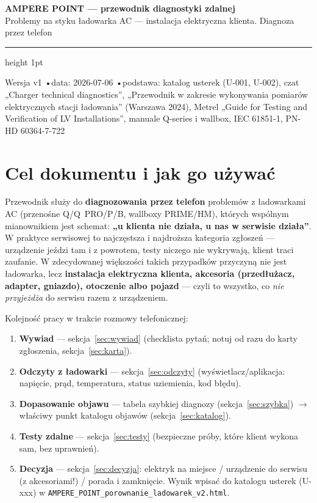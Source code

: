 \documentclass[11pt]{article}
\newcommand{\key}[1]{\textbf{\color{navy}#1}}
\begin{document}
{\sffamily\bfseries\color{navy}\LARGE AMPERE POINT — przewodnik diagnostyki zdalnej}\\[3pt]
{\sffamily\large\color{navy} Problemy na styku ładowarka AC — instalacja elektryczna klienta. Diagnoza przez telefon}\\[6pt]
{\color{rulegrey}\hrule height 1pt}\vspace{4pt}
{\footnotesize\sffamily Wersja v1 \quad•\quad data: 2026-07-06 \quad•\quad podstawa: katalog usterek (U-001, U-002), czat „Charger technical diagnostics'', „Przewodnik w zakresie wykonywania pomiarów elektrycznych stacji ładowania'' (Warszawa 2024), Metrel „Guide for Testing and Verification of LV Installations'', manuale Q-series i wallbox, IEC 61851-1, PN-HD 60364-7-722}\\[2pt]

{\small\setcounter{tocdepth}{1}\tableofcontents}
\clearpage

\section{Cel dokumentu i jak go używać}
Przewodnik służy do \key{diagnozowania przez telefon} problemów z ładowarkami AC (przenośne Q/Q~PRO/P/B, wallboxy PRIME/HM), których wspólnym mianownikiem jest schemat: \key{„u klienta nie działa, u nas w serwisie działa''}. W praktyce serwisowej to najczęstsza i najdroższa kategoria zgłoszeń — urządzenie jeździ tam i z powrotem, testy niczego nie wykrywają, klient traci zaufanie. W zdecydowanej większości takich przypadków przyczyną nie jest ładowarka, lecz \key{instalacja elektryczna klienta, akcesoria (przedłużacz, adapter, gniazdo), otoczenie albo pojazd} — czyli to wszystko, co \emph{nie przyjeżdża} do serwisu razem z urządzeniem.

Kolejność pracy w trakcie rozmowy telefonicznej:
\begin{enumerate}
\item \key{Wywiad} — sekcja~\ref{sec:wywiad} (checklista pytań; notuj od razu do karty zgłoszenia, sekcja~\ref{sec:karta}).
\item \key{Odczyty z ładowarki} — sekcja~\ref{sec:odczyty} (wyświetlacz/aplikacja: napięcie, prąd, temperatura, status uziemienia, kod błędu).
\item \key{Dopasowanie objawu} — tabela szybkiej diagnozy (sekcja~\ref{sec:szybka}) $\rightarrow$ właściwy punkt katalogu objawów (sekcja~\ref{sec:katalog}).
\item \key{Testy zdalne} — sekcja~\ref{sec:testy} (bezpieczne próby, które klient wykona sam, bez uprawnień).
\item \key{Decyzja} — sekcja~\ref{sec:decyzja}: elektryk na miejsce / urządzenie do serwisu (z akcesoriami!) / porada i zamknięcie. Wynik wpisać do katalogu usterek (U-xxx) w \texttt{AMPERE\_\allowbreak POINT\_\allowbreak porownanie\_\allowbreak ladowarek\_\allowbreak v2.html}.
\end{enumerate}
\end{document}
